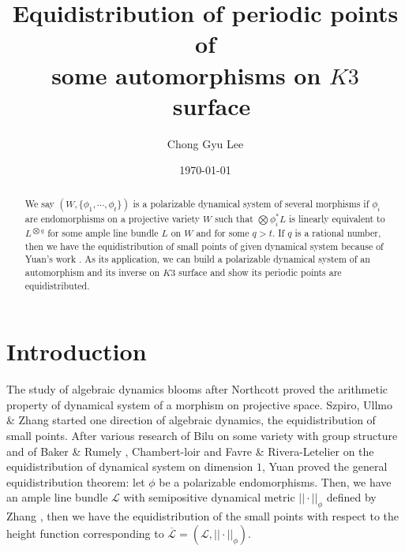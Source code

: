 \documentclass[11pt,letterpaper]{amsart}
\begin{document}
\title[Equidistribution on $K3$ surface]{Equidistribution of periodic points of\\some automorphisms on $K3$~surface}

\author{Chong Gyu Lee}


\date{\today}


\address{Department of Mathematics, University of Illinois at Chicago, Chicago IL 60607, US}


\maketitle

\begin{abstract}
     We say $(W, \{\phi_1, \cdots, \phi_t\})$ is a polarizable dynamical system of several morphisms if $\phi_i$ are endomorphisms on a projective variety $W$ such that $\bigotimes \phi_i^*L$ is linearly equivalent to $L^{\bigotimes q}$ for some ample line bundle $L$ on $W$ and for some $q>t$. If $q$ is a rational number, then we have the equidistribution of small points of given dynamical system because of Yuan's work \cite{Y}. As its application, we can build a polarizable dynamical system of an automorphism and its inverse on $K3$ surface and show its periodic points are equidistributed.
\end{abstract}

\section{Introduction}

    The study of algebraic dynamics blooms after Northcott proved the arithmetic property of dynamical system of a morphism on projective space. Szpiro, Ullmo \& Zhang \cite{SUZ} started one direction of algebraic dynamics, the equidistribution of small points. After various research of  Bilu \cite{B} on some variety with group structure and of Baker \& Rumely \cite{BR}, Chambert-loir \cite{Ch} and Favre \& Rivera-Letelier \cite{FR} on the equidistribution of dynamical system on dimension $1$, Yuan \cite{Y} proved the general equidistribution theorem: let $\phi$ be a polarizable endomorphisms. Then, we have an ample line bundle $\mathcal{L}$ with semipositive dynamical metric $||\cdot||_\phi$ defined by Zhang \cite{Z1}, then we have the equidistribution of the small points with respect to the height function corresponding to $\overline{\mathcal{L}}= (\mathcal{L},||\cdot||_\phi)$.
\end{document}
